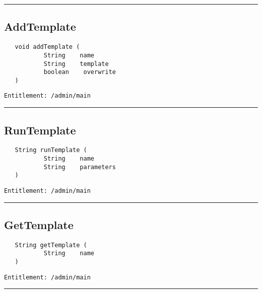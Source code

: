 \rule{12cm}{2pt}
\subsection{AddTemplate}
\label{Api:AddTemplate}
\begin{Verbatim}
   void addTemplate (
           String    name
           String    template
           boolean    overwrite
   )
\end{Verbatim}
\begin{Verbatim}[formatcom=\color{Maroon}]
  Entitlement: /admin/main
\end{Verbatim}



\rule{12cm}{2pt}
\subsection{RunTemplate}
\label{Api:RunTemplate}
\begin{Verbatim}
   String runTemplate (
           String    name
           String    parameters
   )
\end{Verbatim}
\begin{Verbatim}[formatcom=\color{Maroon}]
  Entitlement: /admin/main
\end{Verbatim}



\rule{12cm}{2pt}
\subsection{GetTemplate}
\label{Api:GetTemplate}
\begin{Verbatim}
   String getTemplate (
           String    name
   )
\end{Verbatim}
\begin{Verbatim}[formatcom=\color{Maroon}]
  Entitlement: /admin/main
\end{Verbatim}



\rule{12cm}{2pt}
